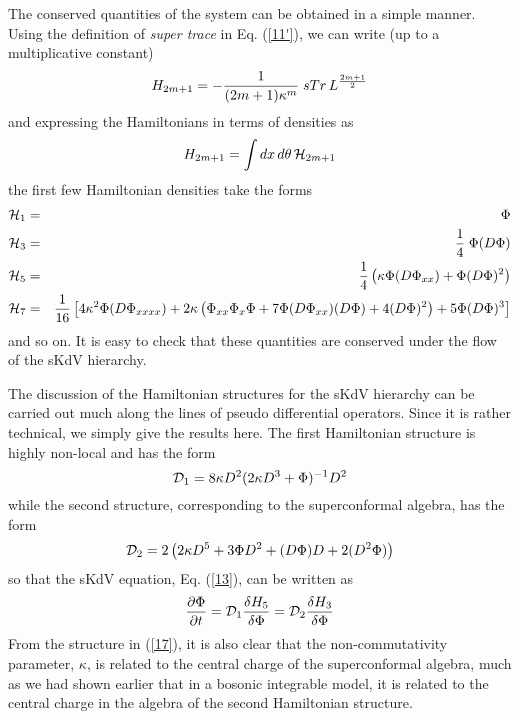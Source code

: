 \documentclass[a4paper,11pt]{article}
\begin{document}
The conserved quantities of the system can be obtained in a simple
manner. Using the definition of {\it super trace} in Eq. (\ref{11'}),
we can write (up to a multiplicative constant)
\begin{equation}
H_{2m+1} = -{1\over (2m+1) \kappa^{m}}\;sTr\,L^{2m+1\over 2}\label{15'}
\end{equation}
and expressing the Hamiltonians in terms of densities as
\[
H_{2m+1} = \int dx\,d\theta\,{\cal H}_{2m+1}
\]
the first few Hamiltonian densities take the forms
\begin{eqnarray}
{\cal H}_{1} & = & \Phi\nonumber\\
{\cal H}_{3} & = & {1\over 4}\;\Phi (D\Phi)\nonumber\\
{\cal H}_{5} & = & {1\over 4}\left(\kappa \Phi(D\Phi_{xx}) + \Phi
(D\Phi)^{2}\right)\nonumber\\
{\cal H}_{7} & = & {1\over 16}\left[4\kappa^{2} \Phi(D\Phi_{xxxx}) +
2\kappa \left(\Phi_{xx}\Phi_{x}\Phi + 7 \Phi(D\Phi_{xx})(D\Phi) + 4
(D\Phi)^{2}\right) + 5 \Phi(D\Phi)^{3}\right]\label{15}
\end{eqnarray}
and so on. It is easy to check that these quantities are conserved
under the flow of the sKdV hierarchy.

The discussion of the Hamiltonian structures for the sKdV hierarchy can
be carried out much along the lines of pseudo differential
operators. Since it is rather technical, we simply give the results
here. The first Hamiltonian structure is highly non-local and has the
form
\begin{equation}
{\cal D}_{1} = 8\kappa D^{2} (2\kappa D^{3}+\Phi)^{-1} D^{2}\label{16}
\end{equation}
while the second structure, corresponding to the superconformal
algebra, has the form
\begin{equation}
{\cal D}_{2} = 2 \left(2\kappa D^{5} + 3\Phi D^{2} + (D\Phi) D + 2
(D^{2}\Phi)\right)\label{17}
\end{equation}
so that the sKdV equation, Eq. (\ref{13}), can be written as
\begin{equation}
{\partial \Phi\over \partial t} = {\cal D}_{1} {\delta H_{5}\over
\delta \Phi} = {\cal D}_{2} {\delta H_{3}\over \delta \Phi}
\end{equation}
From the structure in (\ref{17}), it is also clear that the
non-commutativity parameter, $\kappa$, is related to the central
charge of the superconformal algebra, much as we had shown earlier
\cite{13} 
that in a bosonic integrable model, it is related to the central
charge in the algebra of the second Hamiltonian structure.
\end{document}
